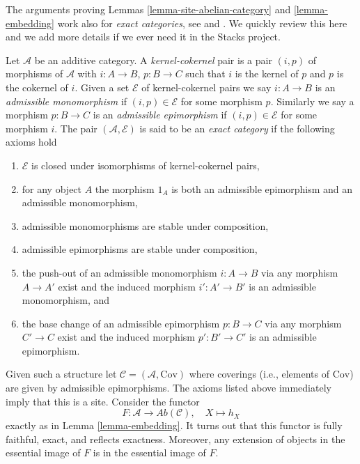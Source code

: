 \begin{remark}
\label{remark-embed-exact-category}
The arguments proving
Lemmas \ref{lemma-site-abelian-category} and
\ref{lemma-embedding}
work also for {\it exact categories}, see
\cite[Appendix A]{Buhler} and
\cite[1.1.4]{BBD}.
We quickly review this here and we add more details if we ever
need it in the Stacks project.

\medskip\noindent
Let $\mathcal{A}$ be an additive category.
A {\it kernel-cokernel} pair is a pair $(i, p)$
of morphisms of $\mathcal{A}$ with
$i : A \to B$, $p : B \to C$ such that $i$ is the kernel of
$p$ and $p$ is the cokernel of $i$.
Given a set $\mathcal{E}$ of kernel-cokernel pairs we say
$i : A \to B$ is an {\it admissible monomorphism}
if $(i, p) \in \mathcal{E}$ for some morphism $p$.
Similarly we say a morphism $p : B \to C$ is an {\it admissible epimorphism}
if $(i, p) \in \mathcal{E}$ for some morphism $i$.
The pair $(\mathcal{A}, \mathcal{E})$ is said to be an
{\it exact category} if the following axioms hold
\begin{enumerate}
\item $\mathcal{E}$ is closed under isomorphisms of kernel-cokernel
pairs,
\item for any object $A$ the morphism $1_A$ is both an admissible epimorphism
and an admissible monomorphism,
\item admissible monomorphisms are stable under composition,
\item admissible epimorphisms are stable under composition,
\item the push-out of an admissible monomorphism $i : A \to B$ via
any morphism $A \to A'$ exist and the induced morphism $i' : A' \to B'$
is an admissible monomorphism, and
\item the base change of an admissible epimorphism $p : B \to C$ via
any morphism $C' \to C$ exist and the induced morphism $p' : B' \to C'$
is an admissible epimorphism.
\end{enumerate}
Given such a structure let $\mathcal{C} = (\mathcal{A}, \text{Cov})$
where coverings (i.e., elements of $\text{Cov}$) are given by
admissible epimorphisms. The axioms listed above
immediately imply that this is a site. Consider the functor
$$
F : \mathcal{A} \longrightarrow \textit{Ab}(\mathcal{C}), \quad
X \longmapsto h_X
$$
exactly as in
Lemma \ref{lemma-embedding}.
It turns out that this functor is fully faithful, exact, and reflects
exactness. Moreover, any extension of objects in the essential image
of $F$ is in the essential image of $F$.
\end{remark}






